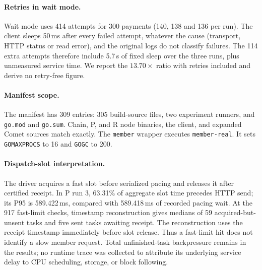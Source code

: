 \paragraph{Retries in wait mode.}
Wait mode uses 414 attempts for 300 payments (140, 138 and 136 per run). The client
sleeps 50\,ms after every failed attempt, whatever the cause (transport, HTTP status or
read error), and the original logs do not classify failures. The 114 extra attempts
therefore include 5.7\,s of fixed sleep over the three runs, plus unmeasured
service time. We report the $13.70\times$ ratio with retries included and derive no
retry-free figure.

\paragraph{Manifest scope.}
The manifest has 309 entries: 305 build-source files, two experiment runners,
and \texttt{go.mod} and \texttt{go.sum}.
Chain, P, and R node binaries, the client, and expanded Comet sources match exactly.
The \texttt{member} wrapper executes \texttt{member-real}.
It sets \texttt{GOMAXPROCS} to 16 and \texttt{GOGC} to 200.

\paragraph{Dispatch-slot interpretation.}
The driver acquires a fast slot before serialized pacing and releases it after
certified receipt. In P run 3, 63.31\% of aggregate slot time precedes HTTP send;
its P95 is 589.422\,ms, compared with 589.418\,ms of recorded pacing wait.
At the 917 fast-limit checks, timestamp reconstruction gives medians of 59
acquired-but-unsent tasks and five sent tasks awaiting receipt.
The reconstruction uses the receipt timestamp immediately before slot release.
Thus a fast-limit hit does not identify a slow member request. Total unfinished-task
backpressure remains in the results; no runtime trace was collected to attribute
its underlying service delay to CPU scheduling, storage, or block following.
